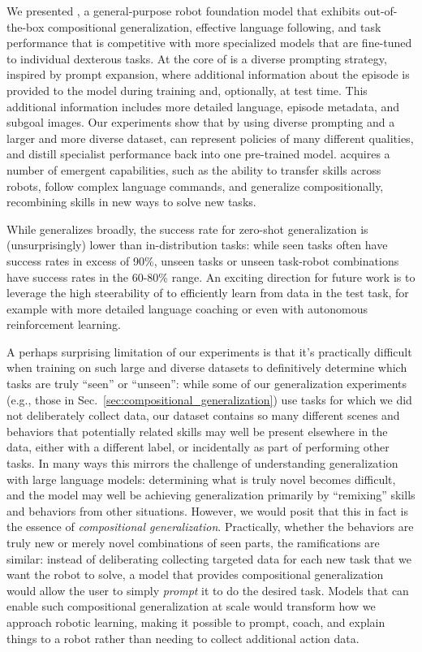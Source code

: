 

We presented \MethodName{}, a general-purpose robot foundation model that exhibits out-of-the-box compositional generalization, effective language following, and task performance that is competitive with more specialized models that are fine-tuned to individual dexterous tasks. At the core of \MethodName{} is a diverse prompting strategy, inspired by prompt expansion, where additional information about the episode is provided to the model during training and, optionally, at test time. This additional information includes more detailed language, episode metadata, and subgoal images. Our experiments show that by using diverse prompting and a larger and more diverse dataset, \MethodName{} can represent policies of many different qualities, and distill specialist performance back into one pre-trained model. \MethodName{}  acquires a number of emergent capabilities, such as the ability to transfer skills across robots, follow complex language commands, and generalize compositionally, recombining skills in new ways to solve new tasks.

While \MethodName{} generalizes broadly, the success rate for zero-shot generalization is (unsurprisingly) lower than in-distribution tasks: while seen tasks often have success rates in excess of 90\%, unseen tasks or unseen task-robot combinations have success rates in the 60-80\% range. An exciting direction for future work is to leverage the high steerability of \MethodName{} to efficiently learn from data in the test task, for example with more detailed language coaching or even with autonomous reinforcement learning.

A perhaps surprising limitation of our experiments is that it's practically difficult when training on such large and diverse datasets to definitively determine which tasks are truly ``seen'' or ``unseen'': while some of our generalization experiments (e.g., those in Sec.~\ref{sec:compositional_generalization}) use tasks for which we did not deliberately collect data, our dataset contains so many different scenes and behaviors that potentially related skills may well be present elsewhere in the data, either with a different label, or incidentally as part of performing other tasks. In many ways this mirrors the challenge of understanding generalization with large language models: determining what is truly novel becomes difficult, and the model may well be achieving generalization primarily by ``remixing'' skills and behaviors from other situations. However, we would posit that this in fact is the essence of \emph{compositional generalization}. Practically, whether the behaviors are truly new or merely novel combinations of seen parts, the ramifications are similar: instead of deliberating collecting targeted data for each new task that we want the robot to solve, a model that provides compositional generalization would allow the user to simply \emph{prompt} it to do the desired task. Models that can enable such compositional generalization at scale would transform how we approach robotic learning, making it possible to prompt, coach, and explain things to a robot rather than needing to collect additional action data.

